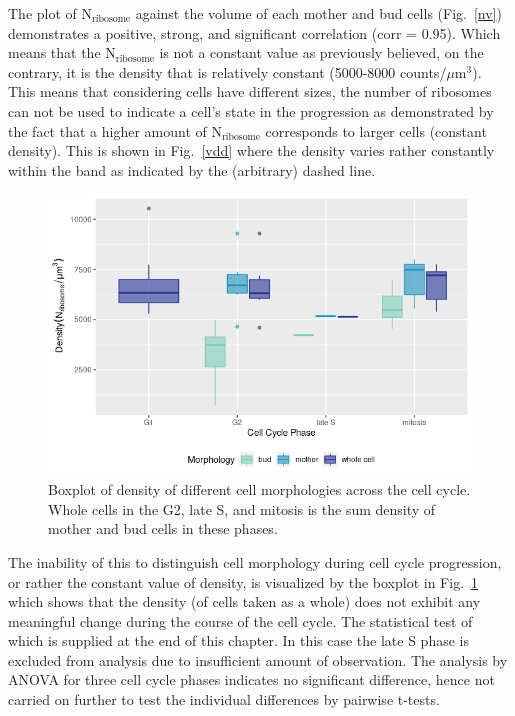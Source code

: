 The plot of N$_{\text{ribosome}}$ against the volume of each mother and bud cells (Fig.~\ref{nv}) demonstrates a positive, strong, and significant correlation (corr = 0.95). 
Which means that the N$_{\text{ribosome}}$ is not a constant value as previously believed, on the contrary, it is the density that is relatively constant (5000-8000 counts/$\mu$m$^3$).
This means that considering cells have different sizes, the number of ribosomes can not be used to indicate a cell's state in the progression as demonstrated by the fact that a higher amount of N$_{\text{ribosome}}$ corresponds to larger cells (constant density). 
This is shown in Fig.~\ref{vdd} where the density varies rather constantly within the band as indicated by the (arbitrary) dashed line.

\begin{figure}[h!]
\centering
\includegraphics[width=0.9\columnwidth]{Exp_9_FCS/Figures/box_d_all}
\caption{Boxplot of density of different cell morphologies across the cell cycle. Whole cells in the G2, late S, and mitosis is the sum density of mother and bud cells in these phases.}
\label{fig:bplot}
\end{figure}

The inability of this to distinguish cell morphology during cell cycle progression, or rather the constant value of density, is visualized by the boxplot in Fig.~\ref{fig:bplot} which shows that the density (of cells taken as a whole) does not exhibit any meaningful change during the course of the cell cycle. 
The statistical test of which is supplied at the end of this chapter. In this case the late S phase is excluded from analysis due to insufficient amount of observation. 
The analysis by ANOVA for three cell cycle phases indicates no significant difference, hence not carried on further to test the individual differences by pairwise t-tests.


